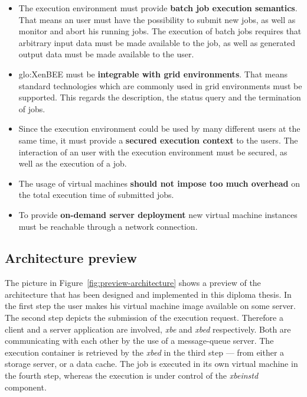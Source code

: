 \begin{itemize}
\item The  execution environment must provide  \textbf{batch job execution
    semantics}. That means an user must have the possibility to submit new
  jobs, as well  as monitor and abort his running  jobs.  The execution of
  batch jobs requires that arbitrary  input data must be made available to
  the job, as well as generated  output data must be made available to the
  user.

\item \gls{glo:XenBEE} must be \textbf{integrable with grid environments}.
  That  means  standard  technologies  which  are commonly  used  in  grid
  environments must be supported. This regards the description, the status
  query and the termination of jobs.

\item  Since the  execution environment  could be  used by  many different
  users  at the  same time,  it must  provide a  \textbf{secured execution
    context} to the  users. The interaction of an  user with the execution
  environment must be secured, as well as the execution of a job.

\item The  usage of  virtual machines \textbf{should  not impose  too much
    overhead} on the total execution time of submitted jobs.

\item To provide \textbf{on-demand  server deployment} new virtual machine
  instances must be reachable through a network connection.
\end{itemize}

\subsection*{Architecture preview}

The  picture in Figure~\ref{fig:preview-architecture}  shows a  preview of
the architecture  that has been  designed and implemented in  this diploma
thesis.   In the  first  step the  user  makes his  virtual machine  image
available on some  server.  The second step depicts  the submission of the
execution  request.   Therefore a  client  and  a  server application  are
involved, \emph{xbe} and \emph{xbed} respectively.  Both are communicating
with  each other  by the  use of  a message-queue  server.   The execution
container  is retrieved  by the  \emph{xbed} in  the third  step  --- from
either a storage server, or a data  cache.  The job is executed in its own
virtual machine in the fourth step, whereas the execution is under control
of the \emph{xbeinstd} component.

